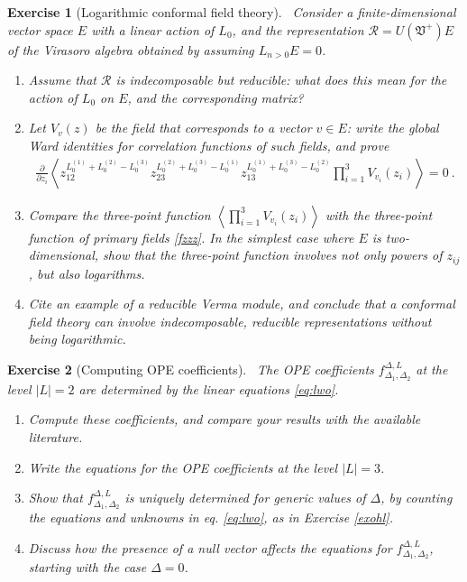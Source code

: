 \documentclass[12pt, a4paper, notitlepage, twoside]{report}
\numberwithin{equation}{section}
\theoremstyle{break}
\newtheorem{exo}{Exercise}[chapter]
\begin{document}
\begin{exo}[Logarithmic conformal field theory]
 ~\label{exolog}
Consider a finite-dimensional vector space $E$ with a linear action of $L_0$, and the representation $\mathcal{R}=U(\mathfrak{V}^+)E$ of the Virasoro algebra obtained by assuming $L_{n>0}E=0$.
\begin{enumerate}
 \item 
Assume that $\mathcal{R}$ is indecomposable but reducible: what does this mean for the action of $L_0$ on $E$, and the corresponding matrix? 
\item
Let $V_v(z)$ be the field that corresponds to a vector $v\in E$: write the global Ward identities for correlation functions of such fields, and prove 
\begin{align}
 {\frac{\partial}{\partial z_i}} \left\langle z_{12}^{L_0^{(1)}+L_0^{(2)}-L_0^{(3)}} z_{23}^{L_0^{(2)}+L_0^{(3)}-L_0^{(1)}} z_{13}^{L_0^{(1)}+L_0^{(3)}-L_0^{(2)}} \prod_{i=1}^3 V_{v_i}(z_i)\right\rangle = 0\ .
\end{align}
\item
Compare the three-point function $\left\langle  \prod_{i=1}^3 V_{v_i}(z_i)\right\rangle$ with the three-point function  of primary fields \eqref{fzzz}.
In the simplest case where $E$ is two-dimensional, show that the three-point function involves not only powers of $z_{ij}$, but also logarithms.
\item
Cite an example of a reducible Verma module, and conclude that 
a conformal field theory can involve indecomposable, reducible representations without being logarithmic. 
\end{enumerate}
\end{exo}


\begin{exo}[Computing OPE coefficients]
 ~\label{exohf}
The OPE coefficients $f^{\Delta,L}_{\Delta_1,\Delta_2}$ at the level $|L|= 2$ are determined by the linear equations \eqref{eq:lwo}.
\begin{enumerate}
 \item Compute these coefficients,
and compare your results with the available literature.
\item
Write the equations for the OPE coefficients at the level $|L|=3$. 
\item
Show that $f^{\Delta,L}_{\Delta_1,\Delta_2}$ is uniquely determined for generic values of $\Delta$, 
by counting the equations and unknowns in eq. \eqref{eq:lwo}, as in Exercise \ref{exohl}.
\item
Discuss how the presence of a null vector affects the equations for $f^{\Delta,L}_{\Delta_1,\Delta_2}$, starting with the case $\Delta=0$. 
\end{enumerate}
\end{exo}
\end{document}
